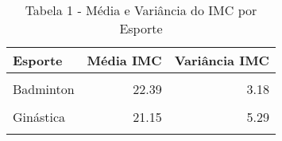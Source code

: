 \documentclass[border=1mm]{standalone}
\begin{document}
\begin{table}
\centering
\caption{Tabela 1 - Média e Variância do IMC por Esporte}
\centering
\begin{tabular}[t]{lrr}
\toprule
Esporte & Média IMC & Variância IMC\\
\midrule
\cellcolor{gray!10}{Atletismo} & \cellcolor{gray!10}{22.03} & \cellcolor{gray!10}{14.23}\\
Badminton & 22.39 & 3.18\\
\cellcolor{gray!10}{Football} & \cellcolor{gray!10}{22.51} & \cellcolor{gray!10}{2.67}\\
Ginástica & 21.15 & 5.29\\
\cellcolor{gray!10}{Judô} & \cellcolor{gray!10}{25.55} & \cellcolor{gray!10}{26.20}\\
\bottomrule
\end{tabular}
\end{table}
\end{document}
